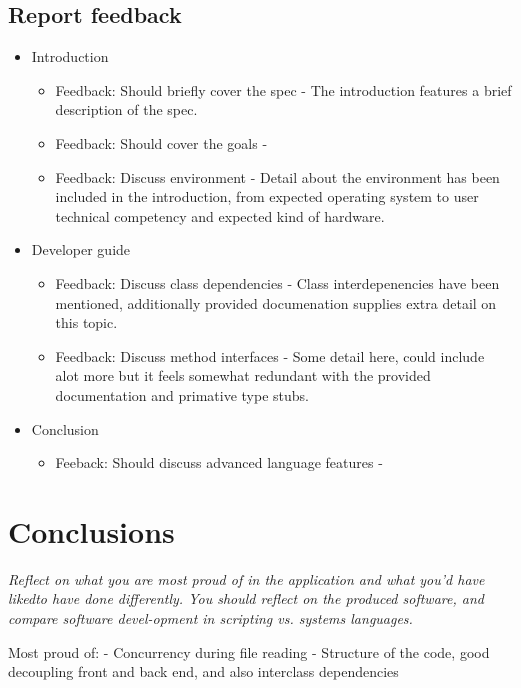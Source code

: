 \documentclass[11pt]{article}
\begin{document}
\subsection{Report feedback}
\begin{itemize}
    \item Introduction
        \begin{itemize}
            \item Feedback: Should briefly cover the spec - The introduction features a brief description of the spec.
            \item Feedback: Should cover the goals - 
            \item Feedback: Discuss environment - Detail about the environment has been included in the introduction, from expected operating system to user technical competency and expected kind of hardware.
        \end{itemize}
    \item Developer guide
        \begin{itemize}
            \item Feedback: Discuss class dependencies - Class interdepenencies have been mentioned, additionally provided documenation supplies extra detail on this topic.
            \item Feedback: Discuss method interfaces - Some detail here, could include alot more but it feels somewhat redundant with the provided documentation and primative type stubs.
        \end{itemize}
    \item Conclusion
        \begin{itemize}
            \item Feeback: Should discuss advanced language features - 
        \end{itemize}
\end{itemize}


\section{Conclusions}
\emph{Reflect on what you are most proud of in the application and what you’d have likedto have done differently.  You should reflect on the produced software, and compare software devel-opment in scripting vs.  systems languages.}



Most proud of:
- Concurrency during file reading
- Structure of the code, good decoupling front and back end, and also interclass dependencies
\end{document}
